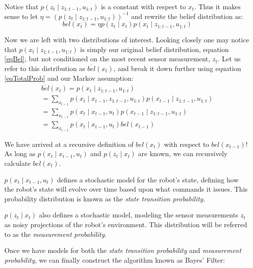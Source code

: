 Notice that \(p(z_t \mathbin{\vert} z_{1:t-1}, u_{1:t})\) is a constant with respect to \(x_t\). Thus it makes sense to let \(\eta = (p(z_t \mathbin{\vert} z_{1:t-1}, u_{1:t}))^{-1}\) and rewrite the belief distribution as:
\begin{equation*}
bel(x_t) = \eta p(z_t \mathbin{\vert} x_t) p(x_t \mathbin{\vert} z_{1:t-1}, u_{1:t})
\end{equation*}

Now we are left with two distributions of interest. Looking closely one may notice that \(p(x_t \mathbin{\vert} z_{1:t-1}, u_{1:t})\) is simply our original belief distribution, equation \ref{eqBel}, but not conditioned on the most recent sensor measurement, \(z_t\). Let us refer to this distribution as \(\overline{bel}(x_t)\), and break it down further using equation \ref{eqTotalProb} and our Markov assumption:
\begin{multline*}
\overline{bel}(x_t) = p(x_t \mathbin{\vert} z_{1:t-1}, u_{1:t}) \\
= \sum\limits_{x_{t-1}} p(x_t \mathbin{\vert} x_{t-1}, z_{1:t-1}, u_{1:t}) p(x_{t-1} \mathbin{\vert} z_{1:t-1}, u_{1:t}) \\
= \sum\limits_{x_{t-1}} p(x_t \mathbin{\vert} x_{t-1}, u_t) p(x_{t-1} \mathbin{\vert} z_{1:t-1}, u_{1:t}) \\
= \sum\limits_{x_{t-1}} p(x_t \mathbin{\vert} x_{t-1}, u_t) bel(x_{t-1})
\end{multline*}

We have arrived at a recursive definition of \(bel(x_t)\) with respect to \(bel(x_{t-1})\)! As long as \(p(x_t \mathbin{\vert} x_{t-1}, u_t)\) and \(p(z_t \mathbin{\vert} x_t)\) are known, we can recursively calculate \(bel(x_t)\).

\(p(x_t \mathbin{\vert} x_{t-1}, u_t)\) defines a stochastic model for the robot's state, defining how the robot's state will evolve over time based upon what commands it issues. This probability distribution is known as the \textit{state transition probability}. \cite{}

\(p(z_t \mathbin{\vert} x_t)\) also defines a stochastic model, modeling the sensor measurements \(z_t\) as noisy projections of the robot's environment. This distribution will be referred to as the \textit{measurement probability}. \cite{}

Once we have models for both the \textit{state transition probability} and \textit{measurement probability}, we can finally construct the algorithm known as Bayes' Filter:


